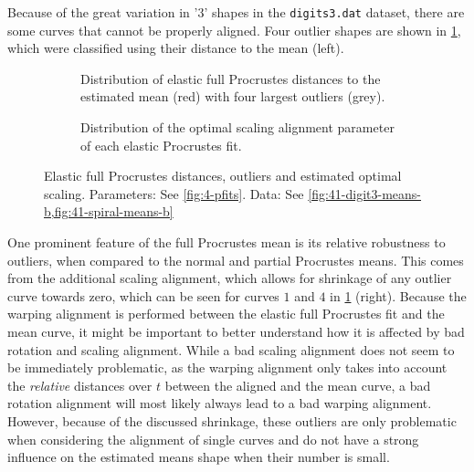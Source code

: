 Because of the great variation in '3' shapes in the \texttt{digits3.dat} dataset, there are some curves that cannot be properly aligned.
Four outlier shapes are shown in \cref{fig:4-outliers}, which were classified using their distance to the mean (left). 
\begin{figure}
  \centering
  \begin{subfigure}[t]{0.60\textwidth}
    \begin{subfigure}{0.40\textwidth}
      \centering
    \end{subfigure}
    \begin{subfigure}{0.60\textwidth}
      \centering
    \end{subfigure}
    \caption{Distribution of elastic full Procrustes distances to the estimated mean (red) with four largest outliers (grey).}
  \end{subfigure}
  \begin{subfigure}[t]{0.40\textwidth}
    \centering
    \caption{Distribution of the optimal scaling alignment parameter of each elastic Procrustes fit.}
  \end{subfigure}
  \caption{Elastic full Procrustes distances, outliers and estimated optimal scaling. Parameters: See \cref{fig:4-pfits}. 
  Data: See \cref{fig:41-digit3-means-b,fig:41-spiral-means-b}}
  \label{fig:4-outliers}
\end{figure}
One prominent feature of the full Procrustes mean is its relative robustness to outliers, when compared to the normal and partial Procrustes means.
This comes from the additional scaling alignment, which allows for shrinkage of any outlier curve towards zero, which can be seen for curves $1$ and $4$ in \cref{fig:4-outliers} (right).
Because the warping alignment is performed between the elastic full Procrustes fit and the mean curve, it might be important to better understand how it is affected by bad rotation and scaling alignment.
While a bad scaling alignment does not seem to be immediately problematic, as the warping alignment only takes into account the \emph{relative} distances over $t$ between the aligned and the mean curve, a bad rotation alignment will most likely always lead to a bad warping alignment.
However, because of the discussed shrinkage, these outliers are only problematic when considering the alignment of single curves and do not have a strong influence on the estimated means shape when their number is small.


